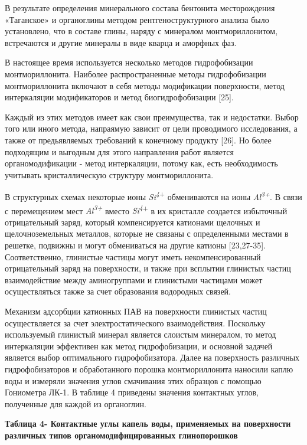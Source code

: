 В результате определения минерального состава бентонита месторождения
«Таганское» и органоглины методом рентгеноструктурного анализа было
установлено, что в составе глины, наряду с минералом монтмориллонитом,
встречаются и другие минералы в виде кварца и аморфных фаз.

В настоящее время используется несколько методов гидрофобизации
монтмориллонита. Наиболее распространенные методы гидрофобизации
монтмориллонита включают в себя методы модификации поверхности, метод
интеркаляции модификаторов и метод биогидрофобизации {[}25{]}.

Каждый из этих методов имеет как свои преимущества, так и недостатки.
Выбор того или иного метода, напраямую зависит от цели проводимого
исследования, а также от предьявляемых требований к конечному продукту
{[}26{]}. Но более подходящим и выгодным для этого направления работ
является органомодификации - метод интеркаляции, потому как, есть
необходимость учитывать кристаллическую структуру монтмориллонита.

В структурных схемах некоторые ионы
\emph{Si\textsuperscript{4}}\textsuperscript{+} обмениваются на ионы
\emph{Al\textsuperscript{3+}}. В связи с перемещением мест
\emph{Al\textsuperscript{3+}} вместо
\emph{Si\textsuperscript{4}}\textsuperscript{+} в их кристалле создается
избыточный отрицательный заряд, который компенсируется катионами
щелочных и щелочноземельных металлов, которые не связаны с определенными
местами в решетке, подвижны и могут обмениваться на другие катионы
{[}23,27-35{]}. Соответственно, глинистые частицы могут иметь
некомпенсированный отрицательный заряд на поверхности, и также при
всплытии глинистых частиц взаимодействие между аминогруппами и
глинистыми частицами может осуществляться также за счет образования
водородных связей.

Механизм адсорбции катионных ПАВ на поверхности глинистых частиц
осуществляется за счет электростатического взаимодействия. Поскольку
используемый глинистый минерал является слоистым минералом, то метод
интеркаляции эффективен как метод гидрофобизации, и основной задачей
является выбор оптимального гидрофобизатора. Далее на поверхность
различных гидрофобизаторов и обработанного порошка монтмориллонита
наносили каплю воды и измеряли значения углов смачивания этих образцов с
помощью Гониометра ЛК-1. В таблице 4 приведены значения контактных
углов, полученные для каждой из органоглин.

\textbf{Таблица 4- Контактные углы капель воды, применяемых на
поверхности различных типов органомодифицированных глинопорошков}

